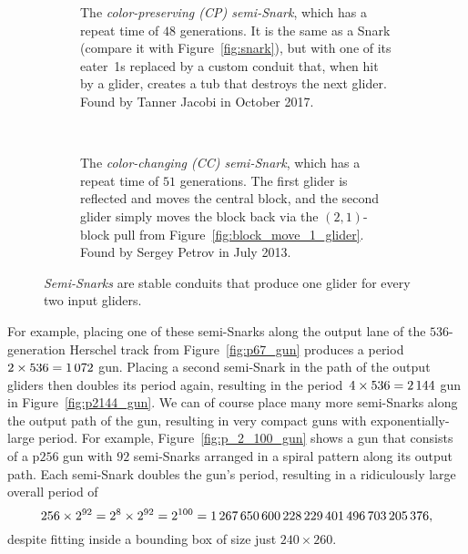 \begin{figure}[!htb]
	\centering
	\begin{subfigure}{\textwidth}
		\centering
		\caption{The \emph{color-preserving (CP) semi-Snark}, which has a repeat time of $48$ generations. It is the same as a Snark (compare it with Figure~\ref{fig:snark}), but with one of its eater~1s replaced by a custom conduit that, when hit by a glider, creates a tub that destroys the next glider. Found by Tanner Jacobi in October 2017. }
		\label{fig:cp_semi_snark}
	\end{subfigure} \\[0.25cm]
	\begin{subfigure}{\textwidth}
		\centering
		\caption{The \emph{color-changing (CC) semi-Snark}, which has a repeat time of $51$ generations. The first glider is reflected and moves the central block, and the second glider simply moves the block back via the $(2,1)$-block pull from Figure~\ref{fig:block_move_1_glider}. Found by Sergey Petrov in July 2013.}
		\label{fig:cc_semi_snark}
	\end{subfigure}
	\caption{\emph{Semi-Snarks} are stable conduits that produce one glider for every two input gliders.}
	\label{fig:semi_snarks}
\end{figure}

For example, placing one of these semi-Snarks along the output lane of the $536$-generation Herschel track from Figure~\ref{fig:p67_gun} produces a period~$2 \times 536=1{\,}072$ gun. Placing a second semi-Snark in the path of the output gliders then doubles its period again, resulting in the period~$4 \times 536=2{\,}144$ gun in Figure~\ref{fig:p2144_gun}. We can of course place many more semi-Snarks along the output path of the gun, resulting in very compact guns with exponentially-large period. For example, Figure~\ref{fig:p_2_100_gun} shows a gun that consists of a p$256$ gun with $92$ semi-Snarks arranged in a spiral pattern along its output path. Each semi-Snark doubles the gun's period, resulting in a ridiculously large overall period of
\[
	256 \times 2^{92} = 2^8 \times 2^{92} = 2^{100} = 1{\,}267{\,}650{\,}600{\,}228{\,}229{\,}401{\,}496{\,}703{\,}205{\,}376,
\]
despite fitting inside a bounding box of size just $240 \times 260$.

